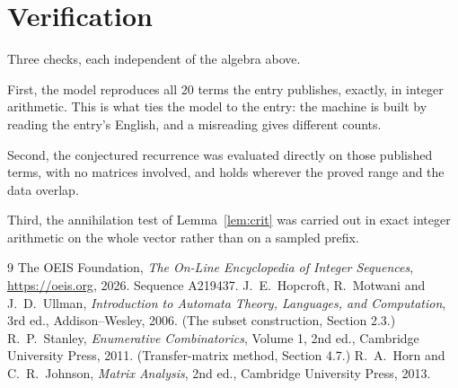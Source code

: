 \documentclass[11pt,a4paper]{article}
\theoremstyle{plain}
\theoremstyle{definition}
\begin{document}
\section{Verification}

Three checks, each independent of the algebra above.

First, the model reproduces all $20$ terms the entry publishes, exactly, in integer
arithmetic. This is what ties the model to the entry: the machine is built by reading the
entry's English, and a misreading gives different counts.

Second, the conjectured recurrence was evaluated directly on those published terms, with no
matrices involved, and holds wherever the proved range and the data overlap.

Third, the annihilation test of Lemma~\ref{lem:crit} was carried out in exact integer
arithmetic on the whole vector rather than on a sampled prefix.

\begin{thebibliography}{9}
 The OEIS Foundation, \emph{The On-Line Encyclopedia of Integer
Sequences}, \url{https://oeis.org}, 2026. Sequence A219437.
 J.~E.~Hopcroft, R.~Motwani and J.~D.~Ullman, \emph{Introduction to Automata
Theory, Languages, and Computation}, 3rd ed., Addison--Wesley, 2006. (The subset
construction, Section 2.3.)
 R.~P.~Stanley, \emph{Enumerative Combinatorics}, Volume 1, 2nd ed.,
Cambridge University Press, 2011. (Transfer-matrix method, Section 4.7.)
 R.~A.~Horn and C.~R.~Johnson, \emph{Matrix Analysis}, 2nd ed., Cambridge
University Press, 2013.
\end{thebibliography}
\end{document}
